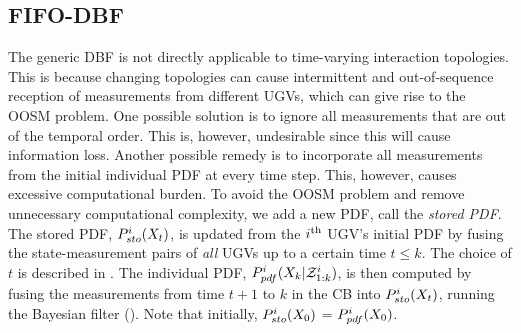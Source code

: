 	\subsection{FIFO-DBF}
	The generic DBF is not directly applicable to time-varying interaction topologies. 
	This is because changing topologies can cause intermittent and out-of-sequence reception of measurements from different UGVs, which can give rise to the OOSM problem.
	One possible solution is to ignore all measurements that are out of the temporal order.
	This is, however, undesirable since this will cause information loss.
	Another possible remedy is to incorporate all measurements from the initial individual PDF at every time step.
	This, however, causes excessive computational burden.
	To avoid the OOSM problem and remove unnecessary computational complexity, we add a new PDF, call the \textit{stored PDF}.
	The stored PDF, $P^{i}_{sto}(X_t)$, is updated from the $i^\text{th}$ UGV's initial PDF by fusing the state-measurement pairs of \textit{all} UGVs up to a certain time $t\le k$.
	The choice of $t$ is described in .
	The individual PDF, $P^i_{pdf}(X_k|\mathcal{Z}^i_{1:k})$, is then computed by fusing the measurements from time $t+1$ to $k$ in the CB into $P^i_{sto}(X_t)$, running the Bayesian filter ().
	Note that initially, $P^{i}_{sto}(X_0)$ = $P^i_{pdf}(X_0)$.
	
